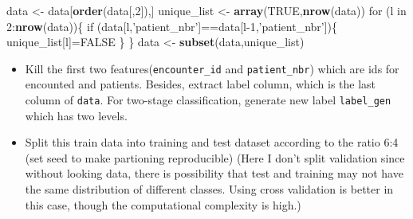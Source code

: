 \documentclass[]{article}
\newenvironment{Shaded}{\begin{snugshade}}{\end{snugshade}}
\newcommand{\KeywordTok}[1]{\textcolor[rgb]{0.13,0.29,0.53}{\textbf{{#1}}}}
\newcommand{\DecValTok}[1]{\textcolor[rgb]{0.00,0.00,0.81}{{#1}}}
\newcommand{\StringTok}[1]{\textcolor[rgb]{0.31,0.60,0.02}{{#1}}}
\newcommand{\OtherTok}[1]{\textcolor[rgb]{0.56,0.35,0.01}{{#1}}}
\newcommand{\NormalTok}[1]{{#1}}
\begin{document}
\begin{Shaded}
\begin{Highlighting}[]
\NormalTok{data <-}\StringTok{ }\NormalTok{data[}\KeywordTok{order}\NormalTok{(data[,}\DecValTok{2}\NormalTok{]),]}
\NormalTok{unique_list <-}\StringTok{ }\KeywordTok{array}\NormalTok{(}\OtherTok{TRUE}\NormalTok{,}\KeywordTok{nrow}\NormalTok{(data))}
\NormalTok{for (l in }\DecValTok{2}\NormalTok{:}\KeywordTok{nrow}\NormalTok{(data))\{}
    \NormalTok{if (data[l,}\StringTok{'patient_nbr'}\NormalTok{]==data[l}\DecValTok{-1}\NormalTok{,}\StringTok{'patient_nbr'}\NormalTok{])\{}
        \NormalTok{unique_list[l]=}\OtherTok{FALSE}
    \NormalTok{\}}
\NormalTok{\}}
\NormalTok{data <-}\StringTok{ }\KeywordTok{subset}\NormalTok{(data,unique_list)}
\end{Highlighting}
\end{Shaded}

\begin{itemize}
\itemsep1pt\parskip0pt
\item
  Kill the first two features(\texttt{encounter\_id} and
  \texttt{patient\_nbr}) which are ids for encounted and patients.
  Besides, extract label column, which is the last column of
  \texttt{data}. For two-stage classification, generate new label
  \texttt{label\_gen} which has two levels.
\end{itemize}

\begin{Shaded}
\end{Shaded}

\begin{itemize}
\itemsep1pt\parskip0pt
\item
  Split this train data into training and test dataset according to the
  ratio 6:4 (set seed to make partioning reproducible) (Here I don't
  split validation since without looking data, there is possibility that
  test and training may not have the same distribution of different
  classes. Using cross validation is better in this case, though the
  computational complexity is high.)
\end{itemize}
\end{document}
